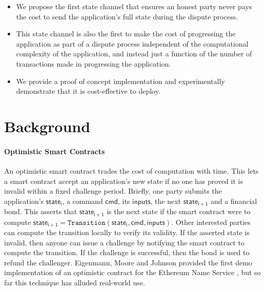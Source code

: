 \documentclass{llncs}
\newcommand{\cmd}{\mathsf{cmd}}
\newcommand{\inputs}{\mathsf{inputs}}
\newcommand{\stateinfoi}{\mathsf{state}_{\mathsf{i}}}
\newcommand{\stateinfoplus}{\mathsf{state}_{\mathsf{i+1}}}
\begin{document}
\begin{itemize}
	\item We propose the first state channel that ensures an honest party never pays the cost to send the application's full state during the dispute process.
	\item This state channel is also the first to make the cost of progressing the application as part of a dispute process independent of the computational complexity of the application, and instead just a function of the number of transactions made in progressing the application.
	\item We provide a proof of concept implementation and experimentally demonstrate that it is cost-effective to deploy. 
\end{itemize}

\section{Background} 

\paragraph{Optimistic Smart Contracts } 


An optimistic smart contract trades the cost of computation with time.
This lets a smart contract accept an application's new state if no one has proved it is invalid within a fixed challenge period. 
Briefly, one party submits the application's $\stateinfoi$, a command $\cmd$, its $\inputs$, the next $\stateinfoplus$ and a financial bond. 
This asserts that $\stateinfoplus$ is the next state if the smart contract were to compute  $\stateinfoplus = \texttt{Transition}(\stateinfoi, \cmd, \inputs)$. 
Other interested parties can compute the transition locally to verify its validity.
If the asserted state is invalid, then anyone can issue a challenge by notifying the smart contract to compute the transition.
If the challenge is successful, then the bond is used to refund the challenger. 
Eigenmann, Moore and Johnson provided the first demo implementation of an optimistic contract for the Ethereum Name Service
\cite{optimisticcontracts}, but so far this technique has alluded real-world use. 
\end{document}
